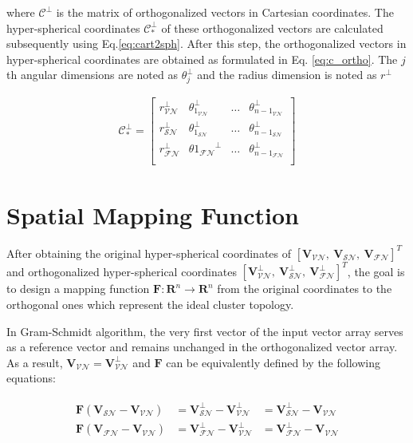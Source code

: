 where $\mathcal{C}^{\perp}$ is the matrix of orthogonalized vectors in Cartesian coordinates. The hyper-spherical coordinates $\mathcal{C}^{\perp}_{*}$ of these orthogonalized vectors are calculated subsequently using Eq.\ref{eq:cart2sph}. After this step, the orthogonalized vectors in hyper-spherical coordinates are obtained as formulated in Eq. \ref{eq:c_ortho}. The $j$th angular dimensions are noted as  $\theta_{j}^{\perp}$ and the radius dimension is noted as $r^{\perp}$%

\begin{align}
\label{eq:c_ortho}
\mathcal{C}^{\perp}_{*} =
\begin{bmatrix}
    r_{\mathcal{VN}}^{\perp} & \theta_{1_{\mathcal{VN}}}^{\perp} & \dots  & \theta_{{n-1}_{\mathcal{VN}}}^{\perp} \\
    r_{\mathcal{SN}}^{\perp} & \theta_{1_{\mathcal{SN}}}^{\perp} & \dots  & \theta_{{n-1}_{\mathcal{SN}}}^{\perp} \\
	r_{\mathcal{FN}}^{\perp} & \theta{1_{\mathcal{FN}}}^{\perp} & \dots  & \theta_{{n-1}_{\mathcal{FN}}}^{\perp} \\
\end{bmatrix}
\end{align}


\section{Spatial Mapping Function}
After obtaining the original hyper-spherical coordinates of $[\mathbf{V}_{\mathcal{VN}},~\mathbf{V}_{\mathcal{SN}},~\mathbf{V}_{\mathcal{FN}}]^T$ and orthogonalized hyper-spherical coordinates $[\mathbf{V}_{\mathcal{VN}}^{\perp},~\mathbf{V}_{\mathcal{SN}}^{\perp},~\mathbf{V}_{\mathcal{FN}}^{\perp}]^T$, the goal is to design a mapping function $\mathbf{F}: \mathbf{R}^n \to \mathbf{R}^n$ from the original coordinates to the orthogonal ones which represent the ideal cluster topology.

In Gram-Schmidt algorithm, the very first vector of the input vector array serves as a reference vector and remains unchanged in the orthogonalized vector array. As a result, $\mathbf{V}_{\mathcal{VN}} = \mathbf{V}_{\mathcal{VN}}^{\perp}$ and $\mathbf{F}$ can be equivalently defined by the following equations:

\begin{align}
\label{eq:constraints}
\begin{aligned}
\mathbf{F}(\mathbf{V}_{\mathcal{SN}} - \mathbf{V}_{\mathcal{VN}}) &= \mathbf{V}_{\mathcal{SN}}^{\perp} - \mathbf{V}_{\mathcal{VN}}^{\perp} &= \mathbf{V}_{\mathcal{SN}}^{\perp} - \mathbf{V}_{\mathcal{VN}}\\
\mathbf{F}(\mathbf{V}_{\mathcal{FN}} - \mathbf{V}_{\mathcal{VN}}) &= \mathbf{V}_{\mathcal{FN}}^{\perp} - \mathbf{V}_{\mathcal{VN}}^{\perp} &= \mathbf{V}_{\mathcal{FN}}^{\perp} - \mathbf{V}_{\mathcal{VN}}
\end{aligned}
\end{align}

